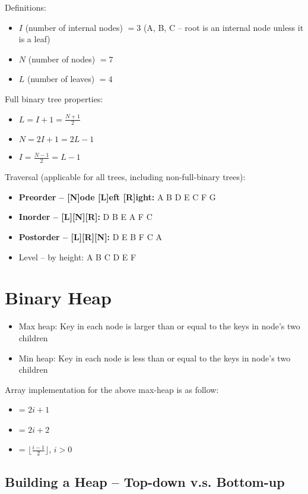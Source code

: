 Definitions:

\begin{itemize}
  \item $I$ (number of internal nodes) $= 3$ (A, B, C -- root is an internal node unless it is a leaf)
  \item $N$ (number of nodes) $= 7$
  \item $L$ (number of leaves) $= 4$
\end{itemize}

Full binary tree properties:

\begin{itemize}
  \item $L = I + 1 = \frac{N + 1}{2}$
  \item $N = 2I + 1 = 2L - 1$
  \item $I = \frac{N - 1}{2} = L - 1$
\end{itemize}

Traversal (applicable for all trees, including non-full-binary trees):

\begin{itemize}
  \item \textbf{Preorder -- [N]ode [L]eft [R]ight:} A B D E C F G
  \item \textbf{Inorder -- [L][N][R]:} D B E A F C
  \item \textbf{Postorder -- [L][R][N]:} D E B F C A
  \item Level -- by height: A B C D E F
\end{itemize}

\section{Binary Heap}

\begin{itemize}
  \item Max heap: Key in each node is larger than or equal to the keys in node's two children
  \item Min heap: Key in each node is less than or equal to the keys in node's two children
\end{itemize}

Array implementation for the above max-heap is as follow:

\begin{itemize}
  \item {} = $2i + 1$
  \item {} = $2i + 2$
  \item {} = $\lfloor \frac{i - 1}{2} \rfloor$, $i > 0$
\end{itemize}

\subsection{Building a Heap -- Top-down v.s. Bottom-up}
